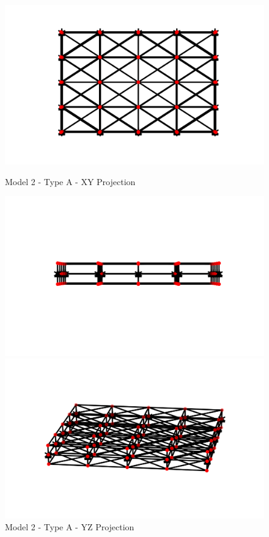 \begin{figure}[!htbp]
\begin{minipage}{0.3\textwidth}
    \centering
    \includegraphics[width = 1\textwidth]{Figures/M2_type_a_XY.png}
    \caption{Model 2 - Type A - XY Projection}
    \label{fig:M2_a_XY}
\end{minipage}
\hspace{5mm}
\begin{minipage}{0.3\textwidth}
    \centering
    \includegraphics[width = 1\textwidth]{Figures/M2_type_a_YZ.png}
    \caption{Model 2 - Type A - YZ Projection}
    \label{fig:M2_a_YZ}
\end{minipage}
\hspace{5mm}
\begin{minipage}{0.3\textwidth}
    \centering
    \includegraphics[width = 1\textwidth]{Figures/M2_type_a_3D.png}

\end{minipage}
\end{figure}
